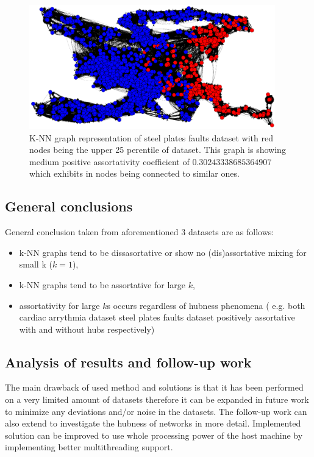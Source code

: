 \begin{figure}[h!]
  \centering
  \captionsetup{justification=centering}
    \includegraphics[width=0.95\textwidth]{images/faults_graph.png}
  \caption{K-NN graph representation of steel plates faults dataset with red nodes being the upper 25 perentile of dataset. This graph is showing medium positive assortativity coefficient of $0.30243338685364907$ which exhibits in nodes being connected to similar ones.}
  \label{fig:graph_faults_nodes}
\end{figure}

\subsection{General conclusions}
General conclusion taken from aforementioned 3 datasets are as follows:
\begin{itemize}
\item k-NN graphs tend to be dissasortative or show no (dis)assortative mixing for small k ($k = 1$),
\item k-NN graphs tend to be assortative for large $k$,
\item assortativity for large $k$s occurs regardless of hubness phenomena ( e.g. both cardiac arrythmia dataset steel plates faults dataset positively assortative with and without hubs respectively) 
\end{itemize}


\subsection{Analysis of results and follow-up work}
The main drawback of used method and solutions is that it has been performed on a very limited amount of datasets therefore it can be expanded in future work to minimize any deviations and/or noise in the datasets.
The follow-up work can also extend to investigate the hubness of networks in more detail.
Implemented solution can be improved to use whole processing power of the host machine by implementing better multithreading support.
